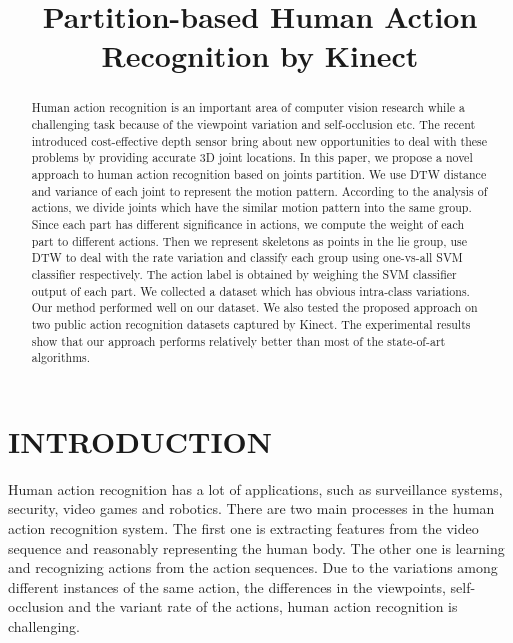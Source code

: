 \documentclass[conference]{IEEEtran}
\begin{document}
\title{Partition-based Human Action Recognition by Kinect}

\author{
}

\maketitle

\begin{abstract}
	Human action recognition is an important area of computer vision research while a challenging task because of the viewpoint variation and self-occlusion etc.
	The recent introduced cost-effective depth sensor bring about new opportunities to deal with these problems by providing accurate 3D joint locations.
	In this paper, we propose a novel approach to human action recognition based on joints partition.
	We use DTW distance and variance of each joint to represent the motion pattern.
	According to the analysis of actions, we divide joints which have the similar motion pattern into the same group.
	Since each part has different significance in actions, we compute the weight of each part to different actions.
	Then we represent skeletons as points in the lie group, use DTW to deal with the rate variation and classify each group using one-vs-all SVM classifier respectively.
	The action label is obtained by weighing the SVM classifier output of each part.
	We collected a dataset which has obvious intra-class variations.
	Our method performed well on our dataset.
	We also tested the proposed approach on two public action recognition datasets captured by Kinect.
	The experimental results show that our approach performs relatively better than most of the state-of-art algorithms.
\end{abstract}
 
\IEEEpeerreviewmaketitle

\section{INTRODUCTION}
Human action recognition has a lot of applications, such as surveillance systems, security, video games and robotics.
There are two main processes in the human action recognition system.
The first one is extracting features from the video sequence and reasonably representing the human body.
The other one is learning and recognizing actions from the action sequences.
Due to the variations among different instances of the same action, the differences in the viewpoints, self-occlusion and the variant rate of the actions, human action recognition is challenging.
\end{document}
